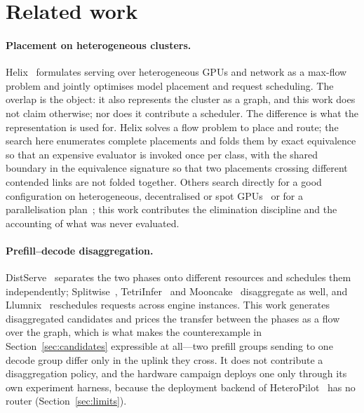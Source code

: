 \section{Related work}
\label{sec:related}

\paragraph{Placement on heterogeneous clusters.}
Helix~\cite{helix} formulates serving over heterogeneous GPUs and network as a max-flow
problem and jointly optimises model placement and request scheduling. The
overlap is the object: it also represents the cluster as a graph, and this work
does not claim otherwise; nor does it contribute a scheduler. The difference is what the representation is used
for. Helix solves a flow problem to place and route; the search here
enumerates complete placements and folds them by exact equivalence so that an
expensive evaluator is invoked once per class, with the shared boundary in the
equivalence signature so that two placements crossing different contended links
are not folded together. Others search directly for a good configuration on
heterogeneous, decentralised or spot
GPUs~\cite{thunderserve,shuntserve,hexgen,melange,spotserve} or for a
parallelisation plan~\cite{alpa,galvatron}; this work contributes the
elimination discipline and the accounting of what was never evaluated.

\paragraph{Prefill--decode disaggregation.}
DistServe~\cite{distserve} separates the two phases onto different resources
and schedules them independently; Splitwise~\cite{splitwise},
TetriInfer~\cite{tetriinfer} and Mooncake~\cite{mooncake} disaggregate as well,
and Llumnix~\cite{llumnix} reschedules requests across engine instances. This
work generates disaggregated candidates and
prices the transfer between the phases as a flow over the graph, which is what
makes the counterexample in Section~\ref{sec:candidates} expressible at
all---two prefill groups sending to one decode group differ only in the uplink
they cross. It does not contribute a disaggregation policy, and the hardware
campaign deploys one only through its own experiment harness, because the
deployment backend of HeteroPilot~\cite{heteropilot} has no router
(Section~\ref{sec:limits}).

